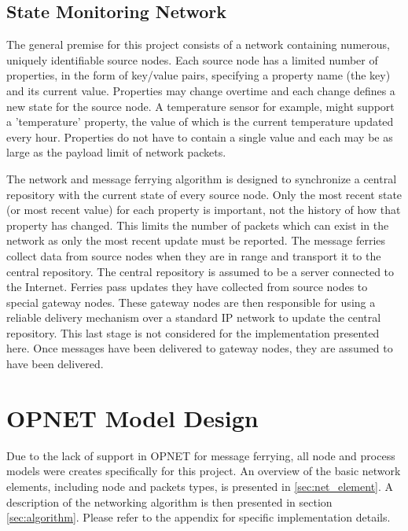 \subsection{State Monitoring Network}

The general premise for this project consists of a network containing numerous, uniquely identifiable source nodes. 
Each source node has a limited number of properties, in the form of key/value pairs, specifying a property name (the key) and its current value.
Properties may change overtime and each change defines a new state for the source node.
A temperature sensor for example, might support a 'temperature' property, the value of which is the current temperature updated every hour.
Properties do not have to contain a single value and each may be as large as the payload limit of network packets. 

The network and message ferrying algorithm is designed to synchronize a central repository with the current state of every source node.
Only the most recent state (or most recent value) for each property is important, not the history of how that property has changed.
This limits the number of packets which can exist in the network as only the most recent update must be reported.
The message ferries collect data from source nodes when they are in range and transport it to the central repository.
The central repository is assumed to be a server connected to the Internet.
Ferries pass updates they have collected from source nodes to special gateway nodes.
These gateway nodes are then responsible for using a reliable delivery mechanism over a standard IP network to update the central repository.
This last stage is not considered for the implementation presented here.
Once messages have been delivered to gateway nodes, they are assumed to have been delivered.

\section{OPNET Model Design}
\label{sec:model_design}

Due to the lack of support in OPNET for message ferrying, all node and process models were creates specifically for this project. 
An overview of the basic network elements, including node and packets types, is presented in \ref{sec:net_element}.
A description of the networking algorithm is then presented in section \ref{sec:algorithm}.
Please refer to the appendix for specific implementation details.

